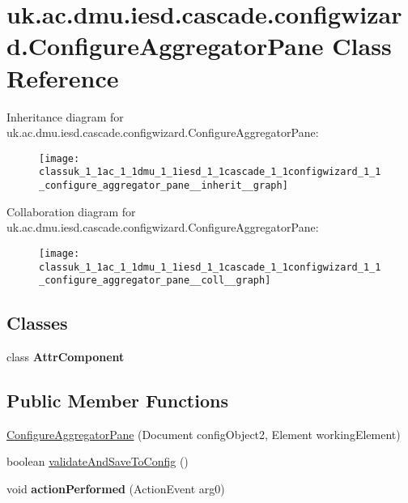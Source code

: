 \hypertarget{classuk_1_1ac_1_1dmu_1_1iesd_1_1cascade_1_1configwizard_1_1_configure_aggregator_pane}{\section{uk.\-ac.\-dmu.\-iesd.\-cascade.\-configwizard.\-Configure\-Aggregator\-Pane Class Reference}
\label{classuk_1_1ac_1_1dmu_1_1iesd_1_1cascade_1_1configwizard_1_1_configure_aggregator_pane}
}


Inheritance diagram for uk.\-ac.\-dmu.\-iesd.\-cascade.\-configwizard.\-Configure\-Aggregator\-Pane\-:\nopagebreak
\begin{figure}[H]
\begin{center}
\leavevmode
\texttt{[image: classuk\_1\_1ac\_1\_1dmu\_1\_1iesd\_1\_1cascade\_1\_1configwizard\_1\_1\_configure\_aggregator\_pane\_\_inherit\_\_graph]}
\end{center}
\end{figure}


Collaboration diagram for uk.\-ac.\-dmu.\-iesd.\-cascade.\-configwizard.\-Configure\-Aggregator\-Pane\-:\nopagebreak
\begin{figure}[H]
\begin{center}
\leavevmode
\texttt{[image: classuk\_1\_1ac\_1\_1dmu\_1\_1iesd\_1\_1cascade\_1\_1configwizard\_1\_1\_configure\_aggregator\_pane\_\_coll\_\_graph]}
\end{center}
\end{figure}
\subsection*{Classes}
\begin{DoxyCompactItemize}
\item 
class {\bfseries Attr\-Component}
\end{DoxyCompactItemize}
\subsection*{Public Member Functions}
\begin{DoxyCompactItemize}
\item 
\hyperlink{classuk_1_1ac_1_1dmu_1_1iesd_1_1cascade_1_1configwizard_1_1_configure_aggregator_pane_ab333d4ab3a7b856493616d7e8c0f263a}{Configure\-Aggregator\-Pane} (Document config\-Object2, Element working\-Element)
\item 
boolean \hyperlink{classuk_1_1ac_1_1dmu_1_1iesd_1_1cascade_1_1configwizard_1_1_configure_aggregator_pane_a7dfeab7abbbd573c885c1dd990538d16}{validate\-And\-Save\-To\-Config} ()
\item 
\hypertarget{classuk_1_1ac_1_1dmu_1_1iesd_1_1cascade_1_1configwizard_1_1_configure_aggregator_pane_a10a278878c9ca35091cdc3d36b652a2e}{void {\bfseries action\-Performed} (Action\-Event arg0)}\label{classuk_1_1ac_1_1dmu_1_1iesd_1_1cascade_1_1configwizard_1_1_configure_aggregator_pane_a10a278878c9ca35091cdc3d36b652a2e}

\end{DoxyCompactItemize}
